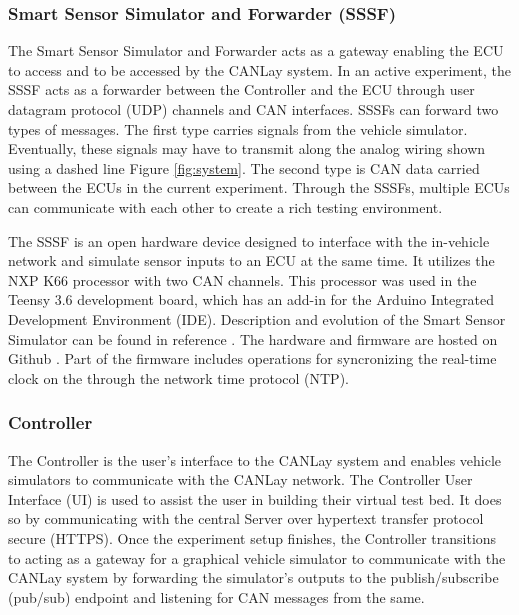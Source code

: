 \documentclass[letterpaper,twocolumn,12pt]{article}
\begin{document}
\subsubsection{Smart Sensor Simulator and Forwarder (SSSF)}
The Smart Sensor Simulator and Forwarder acts as a gateway enabling the ECU to access and to be accessed by the CANLay system. 
In an active experiment, the SSSF acts as a forwarder between the Controller and the ECU through user datagram protocol (UDP) channels and CAN interfaces. SSSFs can forward two types of messages. 
The first type carries signals from the vehicle simulator. Eventually, these signals may have to transmit along the analog wiring shown using a dashed line Figure \ref{fig:system}.  
The second type is CAN data carried between the ECUs in the current experiment. Through the SSSFs, multiple ECUs can communicate with each other to create a rich testing environment.

The SSSF is an open hardware device designed to interface with the in-vehicle network and simulate sensor inputs to an ECU at the same time. It utilizes the NXP K66 processor with two CAN channels. This processor was used in the Teensy 3.6 development board, which has an add-in for the Arduino Integrated Development Environment (IDE). Description and evolution of the Smart Sensor Simulator can be found in reference \cite{RamRohitThesis}. The hardware and firmware are hosted on Github \cite{miniSSS3}. Part of the firmware includes operations for syncronizing the real-time clock on the through the network time protocol (NTP). 

\subsubsection{Controller}
The Controller is the user's interface to the CANLay system and enables vehicle simulators to communicate with the CANLay network. The Controller User Interface (UI) is used to assist the user in building their virtual test bed. 
It does so by communicating with the central Server over hypertext transfer protocol secure (HTTPS). 
Once the experiment setup finishes, the Controller transitions to acting as a gateway for a graphical vehicle simulator to communicate with the CANLay system by forwarding the simulator's outputs to the publish/subscribe (pub/sub) endpoint and listening for CAN messages from the same.
\end{document}
